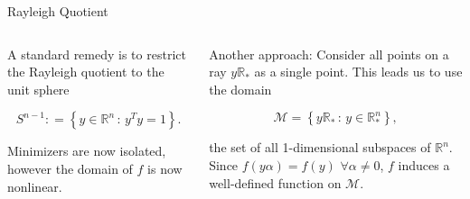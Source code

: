 \documentclass[xcolor=dvipsnames,t]{beamer} %
\newcommand{\reals}{\mathbb{R}}
\newcommand{\defeq}{\mathrel{\mathop:}=}
\begin{document}
\begin{frame}{Rayleigh Quotient}
   \begin{columns}
      \begin{column}{0.5\textwidth}
   A standard remedy is to restrict the Rayleigh quotient to the unit sphere

   \[ S^{n-1}\defeq \left\{y\in\reals^n \,:\, y^Ty=1\right\}. \]
   
   \noindent Minimizers are now isolated, however the domain of $f$ is now nonlinear.\\[.5em]

   
      \end{column}

      \begin{column}{0.5\textwidth}
   Another approach: Consider all points on a ray $y\reals_\ast$ as a single point.  This leads us to use the domain

   \[ \mathcal{M} = \left\{y\reals_\ast \,:\, y\in\reals^n_\ast\right\}, \] 

   \noindent the set of all 1-dimensional subspaces of $\reals^n$.\\[.5em]
   
   Since $f(y\alpha)=f(y)$ $\forall \alpha \neq 0$, $f$ induces a well-defined function on $\mathcal{M}$.
      \end{column}
   \end{columns}
\end{frame}

\end{document}
